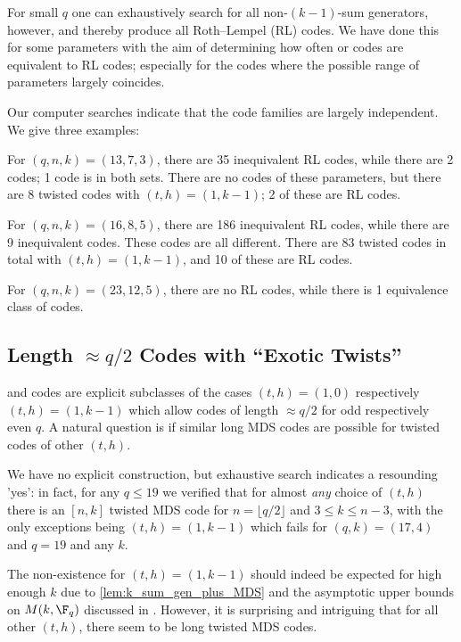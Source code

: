 \documentclass[conference,a4paper]{IEEEtran}
\begin{document}
For small $q$ one can exhaustively search for all non-$(k-1)$-sum generators, however, and thereby produce all Roth--Lempel (RL) codes.
We have done this for some parameters with the aim of determining how often \startw or \plustw codes are equivalent to RL codes; especially for the \plustw codes where the possible range of parameters largely coincides.

Our computer searches indicate that the code families are largely independent.
We give three examples:

For $(q, n, k) = (13, 7, 3)$, there are 35 inequivalent RL codes, while there are 2 \startw codes; 1 code is in both sets.
There are no \plustw codes of these parameters, but there are 8 twisted codes with $(t,h) = (1,k-1)$; 2 of these are RL codes.

For $(q, n, k) = (16, 8, 5)$, there are 186 inequivalent RL codes, while there are 9 inequivalent \plustw codes.
These codes are all different.
There are 83 twisted codes in total with $(t,h) = (1,k-1)$, and 10 of these are RL codes.

For $(q, n, k) = (23, 12, 5)$, there are no RL codes, while there is 1 equivalence class of \startw codes.


\subsection{Length $\approx q/2$ Codes with ``Exotic Twists''}

\startw and \plustw codes are explicit subclasses of the cases $(t,h) = (1,0)$ respectively $(t,h) = (1,k-1)$ which allow codes of length $\approx q/2$ for odd respectively even $q$.
A natural question is if similar long MDS codes are possible for twisted codes of other $(t,h)$.

We have no explicit construction, but exhaustive search indicates a resounding 'yes': in fact, for any $q \leq 19$ we verified that for almost \emph{any} choice of $(t, h)$ there is an $[n,k]$ twisted MDS code for $n = \lfloor q/2 \rfloor$ and $3 \leq k \leq n-3$, with the only exceptions being $(t, h) = (1, k-1)$ which fails for $(q,k) = (17, 4)$ and $q = 19$ and any $k$.

The non-existence for $(t, h) = (1, k-1)$ should indeed be expected for high enough $k$ due to \cref{lem:k_sum_gen_plus_MDS} and the asymptotic upper bounds on $M(k, \F_q)$ discussed in \cite{roth_t-sum_1992}.
However, it is surprising and intriguing that for all other $(t,h)$, there seem to be long twisted MDS codes.
\end{document}
